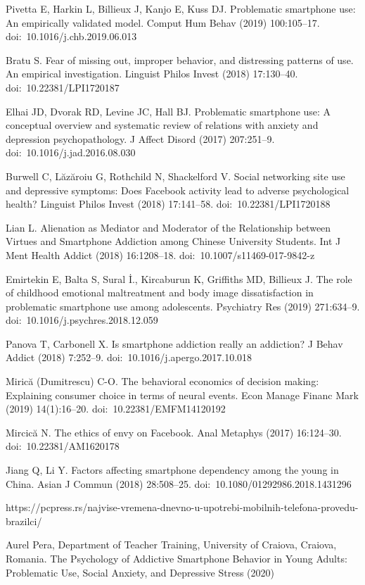 \documentclass[a4paper]{article}
\begin{document}
\newpage
{}
\appendix

\begin{thebibliography}{10}

 Pivetta E, Harkin L, Billieux J, Kanjo E, Kuss DJ. 
Problematic smartphone use: An empirically validated model.
Comput Hum Behav (2019) 100:105–17. doi: 10.1016/j.chb.2019.06.013

 Bratu S. Fear of missing out, improper behavior,
and distressing patterns of use. An empirical investigation.
Linguist Philos Invest (2018) 17:130–40. doi: 10.22381/LPI1720187

 Elhai JD, Dvorak RD, Levine JC, Hall BJ.
Problematic smartphone use: A conceptual overview and systematic review
of relations with anxiety and depression psychopathology.
J Affect Disord (2017) 207:251–9. doi: 10.1016/j.jad.2016.08.030

  Burwell C, Lăzăroiu G, Rothchild N, Shackelford V.
Social networking site use and depressive symptoms:
Does Facebook activity lead to adverse psychological health?
Linguist Philos Invest (2018) 17:141–58. doi: 10.22381/LPI1720188

 Lian L. Alienation as Mediator and 
Moderator of the Relationship between Virtues and Smartphone Addiction among
Chinese University Students. Int J Ment Health Addict (2018) 16:1208–18. doi: 10.1007/s11469-017-9842-z

  Emirtekin E, Balta S, Sural İ., Kircaburun K,
Griffiths MD, Billieux J.
The role of childhood emotional maltreatment and body image dissatisfaction
in problematic smartphone use among adolescents.
Psychiatry Res (2019) 271:634–9. doi: 10.1016/j.psychres.2018.12.059

 Panova T, Carbonell X.
Is smartphone addiction really an addiction? J Behav Addict (2018)
7:252–9. doi: 10.1016/j.apergo.2017.10.018

  Mirică (Dumitrescu) C-O.
The behavioral economics of decision making: Explaining consumer
choice in terms of neural events.
Econ Manage Financ Mark (2019) 14(1):16–20. doi: 10.22381/EMFM14120192

 Mircică N. The ethics of envy on Facebook.
Anal Metaphys (2017) 16:124–30. doi: 10.22381/AM1620178

 Jiang Q, Li Y. Factors affecting
smartphone dependency among the young in China.
Asian J Commun (2018) 28:508–25. doi: 10.1080/01292986.2018.1431296

https://pcpress.rs/najvise-vremena-dnevno-u-upotrebi-mobilnih-telefona-provedu-brazilci/

\bibitem{} Aurel Pera, Department of Teacher Training,
University of Craiova, Craiova, Romania. The Psychology of Addictive
Smartphone Behavior in Young
Adults: Problematic Use, Social
Anxiety, and Depressive Stress (2020)

 
\end{thebibliography}	
\end{document}
